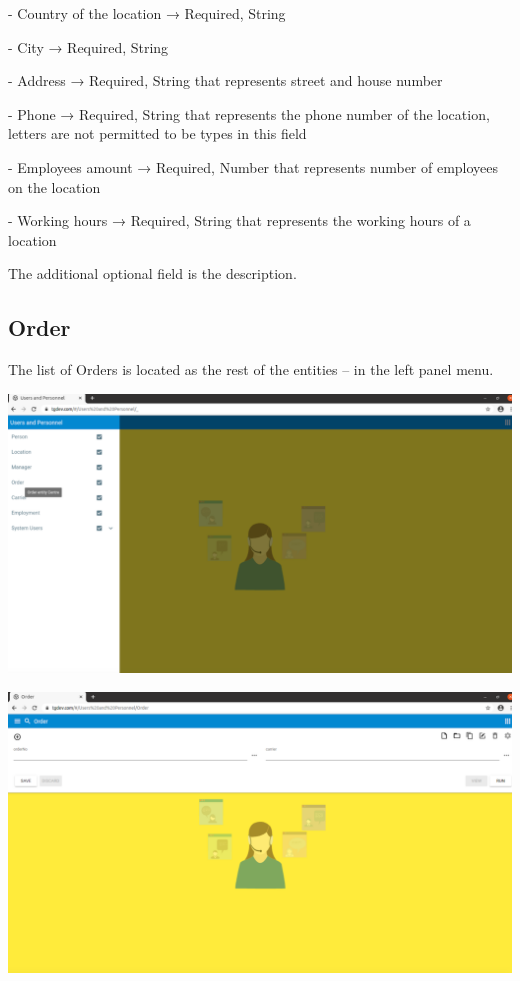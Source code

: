 - Country of the location → Required, String

- City → Required, String

- Address → Required, String that represents street and house number

- Phone → Required, String that represents the phone number of the location, letters are not permitted to be types in this field

- Employees amount → Required, Number that represents number of employees on the location

- Working hours → Required, String that represents the working hours of a location

The additional optional field is the description.


\subsection{Order}

The list of Orders is located as the rest of the entities -- in the left panel menu. 

\includegraphics[width=\textwidth]{sections/01-chapter/images/order1.png}


\includegraphics[width=\textwidth]{sections/01-chapter/images/order2.png}

